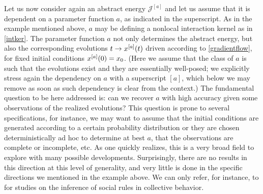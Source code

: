 Let us now consider again an abstract energy $\mathcal J^{[a]}$ and let us assume that it is dependent on a parameter function $a$, as indicated in the superscript. As in the example mentioned above, $a$ may be defining a nonlocal interaction kernel as in  \eqref{intker}. The parameter function $a$ not only determines the abstract energy, but also the corresponding evolutions  $t \to x^{[a]}(t)$ driven according to \eqref{gradientflow}, for fixed initial conditions $x^{[a]}(0)=x_0$. (Here we assume that the class of $a$ is such that the evolutions exist and they are essentially well-posed; we explicitly stress again the dependency on $a$ with a superscript $[a]$, which below we may remove as soon as such dependency is clear from the context.)
The fundamental question to be here addressed is: can we recover $a$ with high accuracy given some observations of the realized evolutions? This question is prone to several specifications, for instance, we may want to assume that the initial conditions are generated according to a certain probability distribution or they are chosen deterministically ad hoc to determine at best $a$, that the observations are complete or incomplete, etc. As one  quickly realizes, this is a very broad field to explore with many possible developments. Surprisingly, there are no results in this direction at this level of generality, and very little is done in the specific directions we mentioned in the example above. We can only refer, for instance,  to \cite{mann11,heoemascszwa11} for studies on the inference of social rules in collective behavior. 
